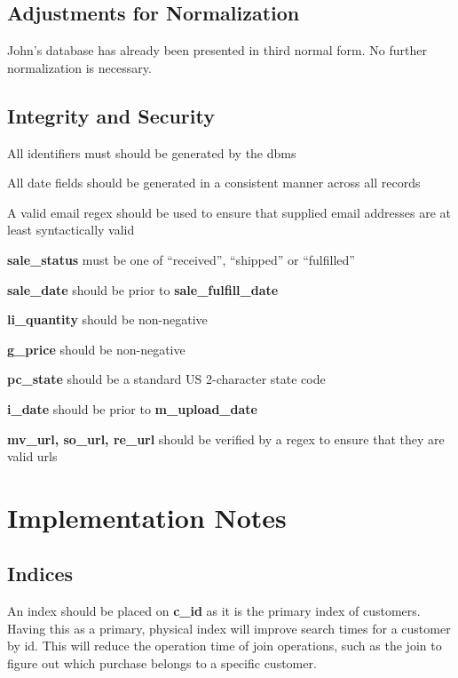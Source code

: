 \documentclass[11pt, a4paper]{report}
\begin{document}
\clearpage
\section{Adjustments for Normalization}
John's database has already been presented in third normal form. No further normalization is necessary.

\clearpage
\section{Integrity and Security}
\begin{itemize*}
    \item All identifiers must should be generated by the dbms
    \item All date fields should be generated in a consistent manner across all records
    \item A valid email regex should be used to ensure that supplied email addresses are at least syntactically valid
    \item \textbf{sale\_status} must be one of ``received'', ``shipped'' or ``fulfilled''
    \item \textbf{sale\_date} should be prior to \textbf{sale\_fulfill\_date}
    \item \textbf{li\_quantity} should be non-negative
    \item \textbf{g\_price} should be non-negative
    \item \textbf{pc\_state} should be a standard US 2-character state code
    \item \textbf{i\_date} should be prior to \textbf{m\_upload\_date}
    \item \textbf{mv\_url, so\_url, re\_url} should be verified by a regex to ensure that they are valid urls
  \end{itemize*}


\chapter{Implementation Notes}

\section{Indices}
An index should be placed on \textbf{c\_id} as it is the primary index of customers. Having this as a primary, physical index will improve search times for a customer by id. This will reduce the operation time of join operations, such as the join to figure out which purchase belongs to a specific customer.
\end{document}
